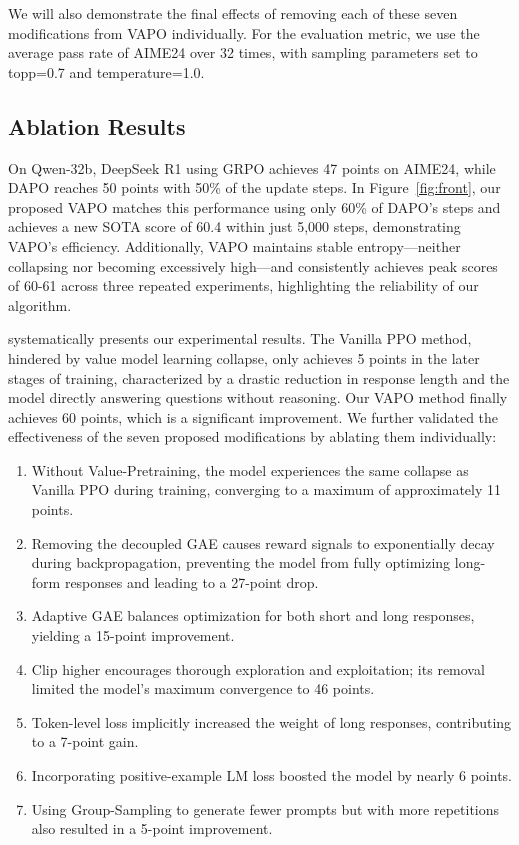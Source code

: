 We will also demonstrate the final effects of removing each of these seven modifications from VAPO individually. For the evaluation metric, we use the average pass rate of AIME24 over 32 times, with sampling parameters set to topp=0.7 and temperature=1.0.


\subsection{Ablation Results}



On Qwen-32b, DeepSeek R1 using GRPO achieves 47 points on AIME24, while DAPO reaches 50 points with 50\% of the update steps. In Figure~\ref{fig:front}, our proposed VAPO matches this performance using only 60\% of DAPO's steps and achieves a new SOTA score of 60.4 within just 5,000 steps, demonstrating VAPO's efficiency. Additionally, VAPO maintains stable entropy—neither collapsing nor becoming excessively high—and consistently achieves peak scores of 60-61 across three repeated experiments, highlighting the reliability of our algorithm.

 systematically presents our experimental results. The Vanilla PPO method, hindered by value model learning collapse, only achieves 5 points in the later stages of training, characterized by a drastic reduction in response length and the model directly answering questions without reasoning.
Our VAPO method finally achieves 60 points, which is a significant improvement. We further validated the effectiveness of the seven proposed modifications by ablating them individually:
\begin{enumerate}
\item Without Value-Pretraining, the model experiences the same collapse as Vanilla PPO during training, converging to a maximum of approximately 11 points.
\item Removing the decoupled GAE causes reward signals to exponentially decay during backpropagation, preventing the model from fully optimizing long-form responses and leading to a 27-point drop.
\item Adaptive GAE balances optimization for both short and long responses, yielding a 15-point improvement.
\item Clip higher encourages thorough exploration and exploitation; its removal limited the model's maximum convergence to 46 points.
\item Token-level loss implicitly increased the weight of long responses, contributing to a 7-point gain.
\item Incorporating positive-example LM loss boosted the model by nearly 6 points.
\item Using Group-Sampling to generate fewer prompts but with more repetitions also resulted in a 5-point improvement.
\end{enumerate}

